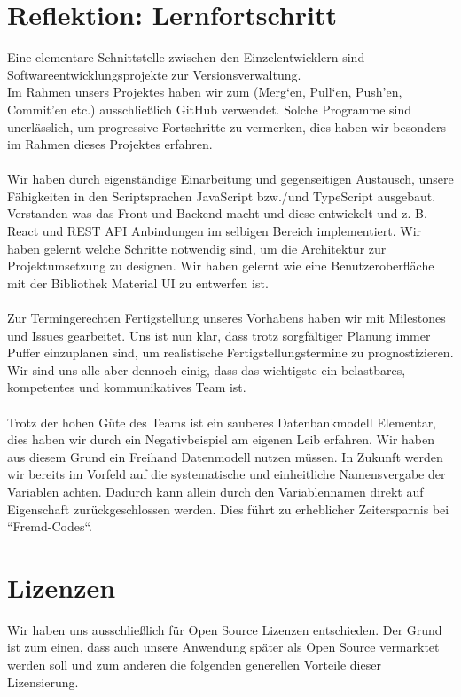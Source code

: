 \section{Reflektion: Lernfortschritt}
Eine elementare Schnittstelle zwischen den Einzelentwicklern sind Softwareentwicklungsprojekte zur Versionsverwaltung.\\ 
Im Rahmen unsers Projektes haben wir zum (Merg‘en, Pull‘en, Push’en, Commit’en etc.) ausschließlich GitHub verwendet. 
Solche Programme sind unerlässlich, um progressive Fortschritte zu vermerken, dies haben wir besonders im Rahmen dieses Projektes erfahren.\\\\ 
Wir haben durch eigenständige Einarbeitung und gegenseitigen Austausch, unsere Fähigkeiten in den Scriptsprachen JavaScript bzw./und TypeScript ausgebaut. 
Verstanden was das Front und Backend macht und diese entwickelt und z. B. React und REST API Anbindungen im selbigen Bereich implementiert. 
Wir haben gelernt welche Schritte notwendig sind, um die Architektur zur Projektumsetzung zu designen.
Wir haben gelernt wie eine Benutzeroberfläche mit der Bibliothek Material UI zu entwerfen ist.\\\\ 
Zur Termingerechten Fertigstellung unseres Vorhabens haben wir mit Milestones und Issues gearbeitet. 
Uns ist nun klar, dass trotz sorgfältiger Planung immer Puffer einzuplanen sind, um realistische Fertigstellungstermine zu prognostizieren. 
Wir sind uns alle aber dennoch einig, dass das wichtigste ein belastbares, kompetentes und kommunikatives Team ist.\\\\  
Trotz der hohen Güte des Teams ist ein sauberes Datenbankmodell Elementar, dies haben wir durch ein Negativbeispiel am eigenen Leib erfahren.
Wir haben aus diesem Grund ein Freihand Datenmodell nutzen müssen.
In Zukunft werden wir bereits im Vorfeld auf die systematische und einheitliche Namensvergabe der Variablen achten. 
Dadurch kann allein durch den Variablennamen direkt auf Eigenschaft zurückgeschlossen werden.
Dies führt zu erheblicher Zeitersparnis bei “Fremd-Codes“.


\section{Lizenzen}
Wir haben uns ausschließlich für Open Source Lizenzen entschieden. 
Der Grund ist zum einen, dass auch unsere Anwendung später als Open Source vermarktet werden soll und zum anderen die folgenden generellen Vorteile dieser Lizensierung.

